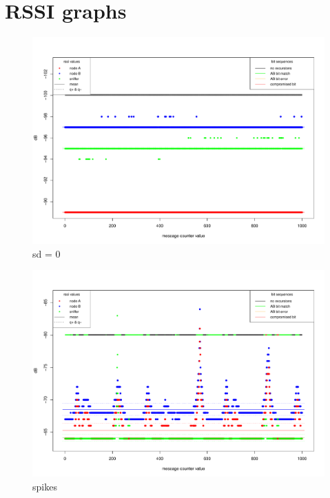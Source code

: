 \documentclass[
  print, %
  table,   %
  nolof,     %
  nolot,     %
           oneside
]{fithesis3}
\begin{document}
\chapter{RSSI graphs}
\begin{figure}
  \includegraphics[height=\textwidth, angle = 90 ]{../images/graph_rssi_01.pdf}
\caption{sd = 0}
\label{fig:rssi_01}
\end{figure}

\begin{figure}
  \includegraphics[height=\textwidth, angle = 90 ]{../images/graph_rssi_02.pdf}
\caption{spikes}
\label{fig:rssi_02}
\end{figure}
\end{document}
